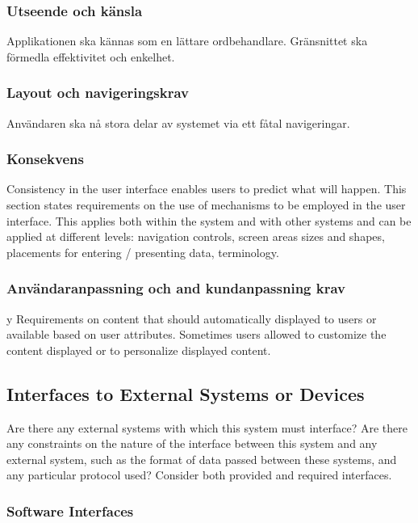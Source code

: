\subsubsection{Utseende och känsla}
Applikationen ska kännas som en lättare ordbehandlare. Gränsnittet ska förmedla effektivitet och enkelhet.

\subsubsection{Layout och navigeringskrav}
Användaren ska nå stora delar av systemet via ett fåtal navigeringar. 

\subsubsection{Konsekvens}

Consistency in the user interface enables users to predict what will happen. This section states requirements on the use of mechanisms to be employed in the user interface. This applies both within the system and with other systems and can be applied at different levels: navigation controls, screen areas sizes and shapes, placements for entering / presenting data, terminology.

\subsubsection{Användaranpassning och and kundanpassning krav}
y
Requirements on content that should automatically displayed to users or available based on user attributes. Sometimes users allowed to customize the content displayed or to personalize displayed content.

\subsection{Interfaces to External Systems or Devices}

Are there any external systems with which this system must interface? Are there any constraints on the nature of the interface between this system and any external system, such as the format of data passed between these systems, and any particular protocol used? Consider both provided and required interfaces.

\subsubsection{Software Interfaces}

